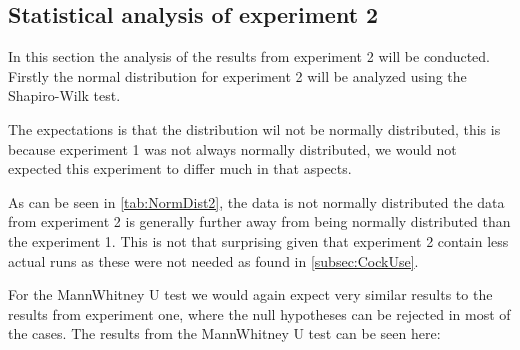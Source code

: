 \subsection{Statistical analysis of experiment 2}
In this section the analysis of the results from experiment 2 will be conducted. Firstly the normal distribution for experiment 2 will be analyzed using the Shapiro-Wilk test. 

The expectations is that the distribution wil not be normally distributed, this is because experiment 1 was not always normally distributed, we would not expected this experiment to differ much in that aspects. 

 

As can be seen in \cref{tab:NormDist2}, the data is not normally distributed the data from experiment 2 is generally further away from being normally distributed than the experiment 1. This is not that surprising given that experiment 2 contain less actual runs as these were not needed as found in \cref{subsec:CockUse}. 

For the MannWhitney U test we would again expect very similar results to the results from experiment one, where the null hypotheses can be rejected in most of the cases.
The results from the MannWhitney U test can be seen here:



